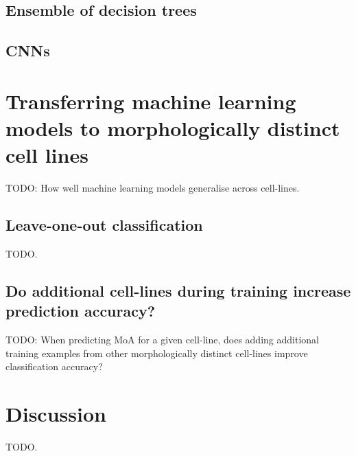 \documentclass[a4paper,11pt,twoside,openright]{scrbook}
\begin{document}
\subsection{Ensemble of decision trees}


\subsection{CNNs}


\section{Transferring machine learning models to morphologically distinct cell lines}
TODO: How well machine learning models generalise across cell-lines.


%        


\subsection{Leave-one-out classification}
TODO.

\subsection{Do additional cell-lines during training increase prediction accuracy?}
TODO: When predicting MoA for a given cell-line, does adding additional training examples from other morphologically distinct cell-lines improve classification accuracy?



\section{Discussion}
TODO.
\end{document}
